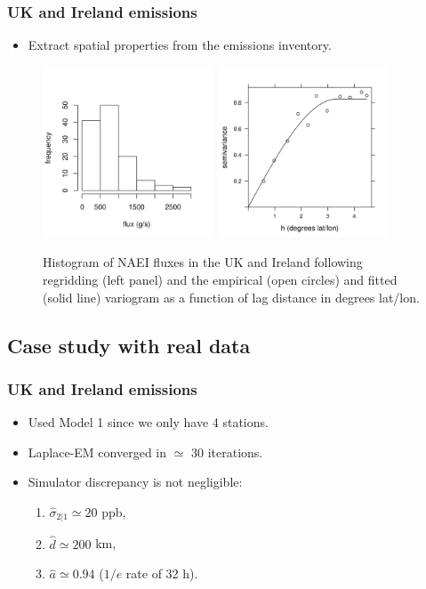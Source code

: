 \documentclass{beamer}
\begin{document}
\begin{frame}
\frametitle{UK and Ireland emissions}
\begin{itemize}
\item Extract spatial properties from the emissions inventory.
\end{itemize}
\begin{center}
\vspace{-0.5cm}

\begin{figure}
\includegraphics[width=2.0in]{histUK.png}  
\includegraphics[width=2.0in]{variogram_est.png}  
	\caption{Histogram of NAEI fluxes in the UK and Ireland following regridding (left panel) and the empirical (open circles) and fitted (solid line) variogram as a function of lag distance in degrees lat/lon. } \label{fig:var_est}
\end{figure}
\end{center}
\end{frame}

\subsection{Case study with real data}

\begin{frame}
\frametitle{UK and Ireland emissions}
\begin{itemize}
\item Used Model 1 since we only have 4 stations. \vfill
\item Laplace-EM converged in $\simeq$ 30 iterations. \vfill
\item Simulator discrepancy is not negligible: \vfill
\begin{enumerate}
\item $\hat\sigma_{2|1} \simeq 20$ ppb, \vfill
\item $\hat d \simeq 200$ km, \vfill
\item $\hat a \simeq 0.94$ ($1/e$ rate of 32 h). \vfill
\end{enumerate}
\end{itemize}
\end{frame}
\end{document}
